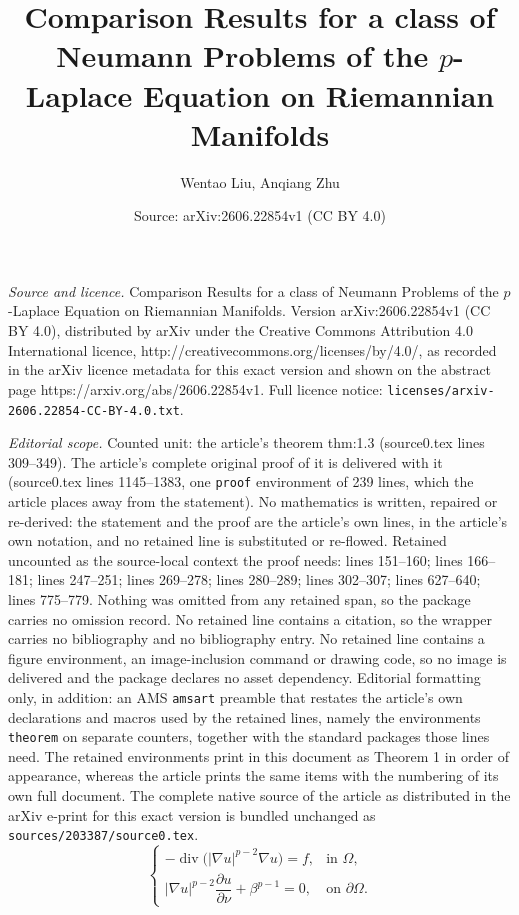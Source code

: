 \documentclass[10pt,a4paper]{amsart}
\title{Comparison Results for a class of Neumann Problems of the $p$-Laplace Equation on Riemannian Manifolds}
\author{Wentao Liu, Anqiang Zhu}
\date{Source: arXiv:2606.22854v1 (CC BY 4.0)}
\begin{document}
\maketitle

\noindent\emph{Source and licence.} Comparison Results for a class of Neumann Problems of the $p$-Laplace Equation on Riemannian Manifolds. Version arXiv:2606.22854v1 (CC BY 4.0), distributed by arXiv under the Creative Commons Attribution 4.0 International licence, http://creativecommons.org/licenses/by/4.0/, as recorded in the arXiv licence metadata for this exact version and shown on the abstract page https://arxiv.org/abs/2606.22854v1. Full licence notice: \texttt{licenses/arxiv-2606.22854-CC-BY-4.0.txt}.\par\smallskip

\noindent\textit{Editorial scope.} Counted unit: the article's theorem thm:1.3 (source0.tex lines 309--349). The article's complete original proof of it is delivered with it (source0.tex lines 1145--1383, one \texttt{proof} environment of 239 lines, which the article places away from the statement). No mathematics is written, repaired or re-derived: the statement and the proof are the article's own lines, in the article's own notation, and no retained line is substituted or re-flowed.  Retained uncounted as the source-local context the proof needs: lines 151--160; lines 166--181; lines 247--251; lines 269--278; lines 280--289; lines 302--307; lines 627--640; lines 775--779.  Nothing was omitted from any retained span, so the package carries no omission record.  No retained line contains a citation, so the wrapper carries no bibliography and no bibliography entry.  No retained line contains a figure environment, an image-inclusion command or drawing code, so no image is delivered and the package declares no asset dependency.  Editorial formatting only, in addition: an AMS \texttt{amsart} preamble that restates the article's own declarations and macros used by the retained lines, namely the environments \texttt{theorem} on separate counters, together with the standard packages those lines need.  The retained environments print in this document as Theorem 1 in order of appearance, whereas the article prints the same items with the numbering of its own full document.  The complete native source of the article as distributed in the arXiv e-print for this exact version is bundled unchanged as \texttt{sources/203387/source0.tex}.
\begin{equation}\label{eq:1.3}
\begin{cases}
-\operatorname{div}\bigl(|\nabla u|^{p-2}\nabla u\bigr)=f,
& \text{in }\Omega,
\\[1ex]
|\nabla u|^{p-2}\dfrac{\partial u}{\partial\nu}
+\beta^{p-1}=0,
& \text{on }\partial\Omega.
\end{cases}
\end{equation}
\end{document}
